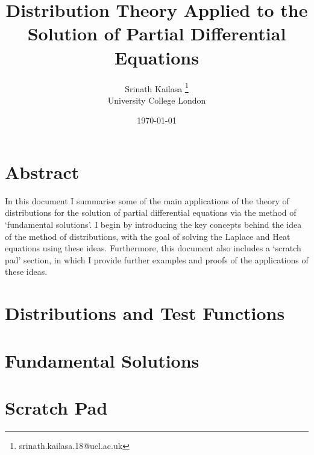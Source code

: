 \documentclass[12pt, a4, twoside]{article}
\title{Distribution Theory Applied to the Solution of Partial Differential Equations}
\author{Srinath Kailasa \thanks{srinath.kailasa.18@ucl.ac.uk} \\ \small University College London}
\date{\today}
\begin{document}
\maketitle

\section*{Abstract}

In this document I summarise some of the main applications of the theory of distributions for the solution of partial differential equations via the method of `fundamental solutions'. I begin by introducing the key concepts behind the idea of the method of distributions, with the goal of solving the Laplace and Heat equations using these ideas. Furthermore, this document also includes a `scratch pad' section, in which I provide further examples and proofs of the applications of these ideas.


\section{Distributions and Test Functions}


\section{Fundamental Solutions}


\section{Scratch Pad}
\end{document}
